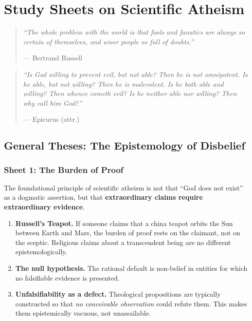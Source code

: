 \chapter{Study Sheets on Scientific Atheism}

\begingroup

\begin{quote}
\textit{``The whole problem with the world is that fools and fanatics are always
so certain of themselves, and wiser people so full of doubts.''}

\medskip
\hfill--- Bertrand Russell
\end{quote}

\begin{quote}
\textit{``Is God willing to prevent evil, but not able? Then he is not
omnipotent.  Is he able, but not willing?  Then he is malevolent.
Is he both able and willing?  Then whence cometh evil?
Is he neither able nor willing?  Then why call him God?''}

\medskip
\hfill--- Epicurus (attr.)
\end{quote}

\section{General Theses: The Epistemology of Disbelief}

\subsection{Sheet 1: The Burden of Proof}
The foundational principle of scientific atheism is not that ``God does not
exist'' as a dogmatic assertion, but that \textbf{extraordinary claims require
extraordinary evidence}.

\begin{enumerate}
  \item \textbf{Russell's Teapot.}
    If someone claims that a china teapot orbits the Sun between Earth and Mars,
    the burden of proof rests on the claimant, not on the sceptic.  Religious
    claims about a transcendent being are no different epistemologically.
  \item \textbf{The null hypothesis.}
    The rational default is non-belief in entities for which no falsifiable
    evidence is presented.
  \item \textbf{Unfalsifiability as a defect.}
    Theological propositions are typically constructed so that \emph{no
    conceivable observation} could refute them.  This makes them
    epistemically vacuous, not unassailable.
\end{enumerate}

